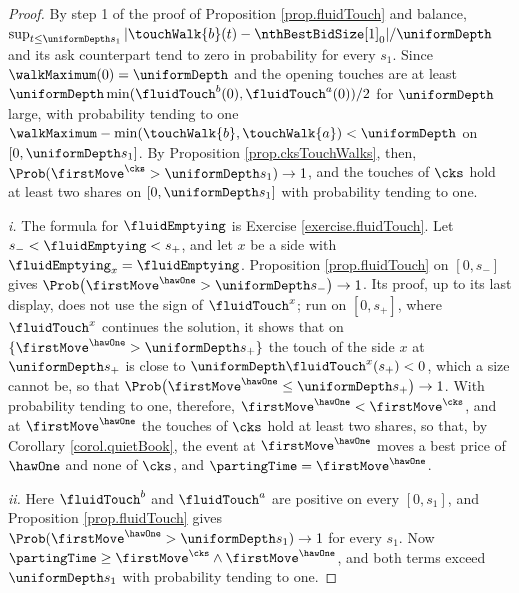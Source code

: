 \begin{proof}
 By step 1 of the proof of Proposition \ref{prop.fluidTouch} and balance,
 $\sup_{t \leq \uniformDepth s_1}
 \vert \touchWalk{b}(t) - \nthBestBidSize[1]_0 \vert / \uniformDepth$
 and its ask counterpart tend to zero in probability for every $s_1$.
 Since $\walkMaximum(0) = \uniformDepth$
 and the opening touches are at least
 $\uniformDepth \min(\fluidTouch^{b}(0), \fluidTouch^{a}(0))/2$
 for $\uniformDepth$ large,
 with probability tending to one
 $\walkMaximum - \min(\touchWalk{b}, \touchWalk{a}) < \uniformDepth$
 on $[0, \uniformDepth s_1]$.
 By Proposition \ref{prop.cksTouchWalks}, then,
 $\Prob(\firstMove^{\cks} > \uniformDepth s_1) \to 1$,
 and the touches of $\cks$ hold at least two shares on $[0, \uniformDepth s_1]$
 with probability tending to one.

 \emph{i.}
 The formula for $\fluidEmptying$ is Exercise \ref{exercise.fluidTouch}.
 Let $s_{-} < \fluidEmptying < s_{+}$,
 and let $x$ be a side with $\fluidEmptying_{x} = \fluidEmptying$.
 Proposition \ref{prop.fluidTouch} on $[0, s_{-}]$ gives
 $\Prob\big( \firstMove^{\hawOne} > \uniformDepth s_{-} \big) \to 1$.
 Its proof, up to its last display,
 does not use the sign of $\fluidTouch^{x}$;
 run on $[0, s_{+}]$, where $\fluidTouch^{x}$ continues the solution,
 it shows that on
 $\lbrace \firstMove^{\hawOne} > \uniformDepth s_{+} \rbrace$
 the touch of the side $x$ at $\uniformDepth s_{+}$ is close to
 $\uniformDepth\fluidTouch^{x}(s_{+}) < 0$,
 which a size cannot be,
 so that
 $\Prob\big( \firstMove^{\hawOne} \leq \uniformDepth s_{+} \big) \to 1$.
 With probability tending to one, therefore,
 $\firstMove^{\hawOne} < \firstMove^{\cks}$,
 and at $\firstMove^{\hawOne}$ the touches of $\cks$ hold at least two shares,
 so that, by Corollary \ref{corol.quietBook},
 the event at $\firstMove^{\hawOne}$ moves a best price of $\hawOne$ and none of $\cks$,
 and $\partingTime = \firstMove^{\hawOne}$.

 \emph{ii.}
 Here $\fluidTouch^{b}$ and $\fluidTouch^{a}$ are positive on every $[0, s_1]$,
 and Proposition \ref{prop.fluidTouch} gives
 $\Prob(\firstMove^{\hawOne} > \uniformDepth s_1) \to 1$ for every $s_1$.
 Now $\partingTime \geq \firstMove^{\cks} \wedge \firstMove^{\hawOne}$,
 and both terms exceed $\uniformDepth s_1$ with probability tending to one.
\end{proof}

